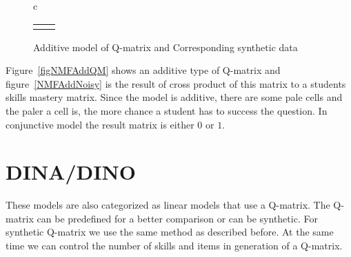 \begin{figure}[h]
\begin{tabular}{c}
\\
\begin{tabular}{cc}
\subfigure[Raw Result matrix ]{
   \includegraphics[scale =0.5] {NMFAddNonNoisy.pdf}\label{NMFAddNonNoisy}
 }\quad
&
\subfigure[Discretized result matrix with 20\% slip and 10\% guess factor]{
   \includegraphics[scale =0.5] {NMFAddNoisy}\label{NMFAddNoisy}
 }\quad
\end{tabular}
\end{tabular}
\caption{Additive model of Q-matrix and Corresponding synthetic data}
\label{figNMFAddgen}
\end{figure}

Figure~\ref{figNMFAddQM} shows an additive type of Q-matrix and figure~\ref{NMFAddNoisy} is the result of cross product of this matrix to a students skills mastery matrix. Since the model is additive, there are some pale cells and the paler a cell is, the more chance a student has to success the question. In conjunctive model the result matrix is either $0$ or $1$. 

\section{DINA/DINO}
These models are also categorized as linear models that use a Q-matrix. The Q-matrix can be predefined for a better comparison or can be synthetic. For synthetic Q-matrix we use the same method as described before. At the same time we can control the number of skills and items in generation of a Q-matrix.


